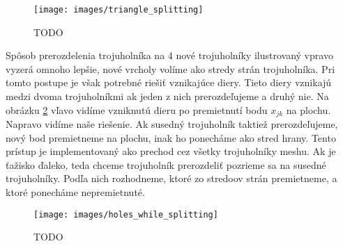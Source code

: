 \begin{figure}
    \centerline{\texttt{[image: images/triangle\_splitting]}}
    \caption[TODO]{TODO}
    \label{obr:triangle_splitting}
\end{figure}

Spôsob prerozdelenia 
trojuholníka na 4 nové trojuholníky ilustrovaný vpravo vyzerá omnoho lepšie, nové vrcholy
volíme ako stredy strán trojuholníka. Pri tomto postupe je však potrebné riešiť vznikajúce diery.
Tieto diery vznikajú medzi dvoma trojuholníkmi ak jeden z nich prerozdeľujeme
a druhý nie. Na obrázku \ref{obr:holes_while_splitting} vľavo vidíme vzniknutú dieru po premietnutí bodu
$x_{jk}$ na plochu. Napravo vidíme naše riešenie. Ak susedný trojuholník taktiež prerozdeľujeme, nový bod
premietneme na plochu, inak ho ponecháme ako stred hrany. Tento prístup je implementovaný ako 
prechod cez všetky trojuholníky meshu. Ak je ťažisko ďaleko, teda chceme trojuholník prerozdeliť
pozrieme sa na susedné trojuholníky. Podľa nich rozhodneme, ktoré zo stredoov strán premietneme,
a ktoré ponecháme nepremietnuté.

\begin{figure}
    \centerline{\texttt{[image: images/holes\_while\_splitting]}}
    \caption[TODO]{TODO}
    \label{obr:holes_while_splitting}
\end{figure}